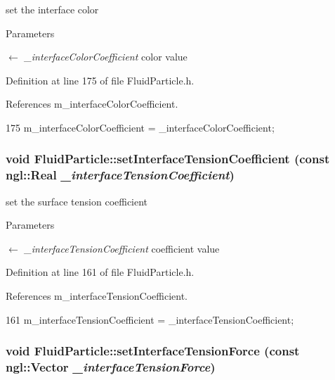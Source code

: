 set the interface color 


\begin{DoxyParams}{Parameters}
\item[\mbox{$\leftarrow$} {\em \_\-interfaceColorCoefficient}]color value \end{DoxyParams}


Definition at line 175 of file FluidParticle.h.



References m\_\-interfaceColorCoefficient.




\begin{DoxyCode}
175 { m_interfaceColorCoefficient = _interfaceColorCoefficient; }
\end{DoxyCode}


\hypertarget{class_fluid_particle_a00b8eca62e076dcd2d8dff6ad6619ead}{
\subsubsection[{setInterfaceTensionCoefficient}]{\setlength{\rightskip}{0pt plus 5cm}void FluidParticle::setInterfaceTensionCoefficient (const ngl::Real {\em \_\-interfaceTensionCoefficient})}}
\label{class_fluid_particle_a00b8eca62e076dcd2d8dff6ad6619ead}


set the surface tension coefficient 


\begin{DoxyParams}{Parameters}
\item[\mbox{$\leftarrow$} {\em \_\-interfaceTensionCoefficient}]coefficient value \end{DoxyParams}


Definition at line 161 of file FluidParticle.h.



References m\_\-interfaceTensionCoefficient.




\begin{DoxyCode}
161 { m_interfaceTensionCoefficient = _interfaceTensionCoefficient; }
\end{DoxyCode}


\hypertarget{class_fluid_particle_a33e789925811ce4517440460e5423531}{
\subsubsection[{setInterfaceTensionForce}]{\setlength{\rightskip}{0pt plus 5cm}void FluidParticle::setInterfaceTensionForce (const ngl::Vector {\em \_\-interfaceTensionForce})}}
\label{class_fluid_particle_a33e789925811ce4517440460e5423531}


